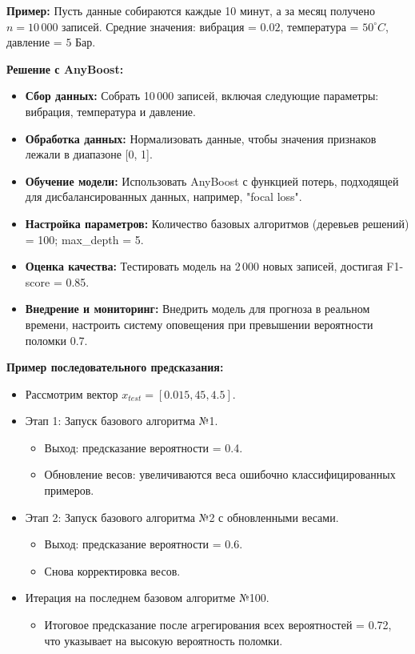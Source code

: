 \textbf{Пример:} 
Пусть данные собираются каждые 10 минут, а за месяц получено $n = 10\,000$ записей. Средние значения: вибрация = $0.02$, температура = $50^\circ C$, давление = $5$ Бар.

\textbf{Решение с AnyBoost:}
\begin{itemize}
    \item \textbf{Сбор данных:} Собрать 10\,000 записей, включая следующие параметры: вибрация, температура и давление.
    \item \textbf{Обработка данных:} Нормализовать данные, чтобы значения признаков лежали в диапазоне [0, 1].
    \item \textbf{Обучение модели:} Использовать AnyBoost с функцией потерь, подходящей для дисбалансированных данных, например, "focal loss".
    \item \textbf{Настройка параметров:} Количество базовых алгоритмов (деревьев решений) = 100; max\_depth = 5.
    \item \textbf{Оценка качества:} Тестировать модель на 2\,000 новых записей, достигая F1-score = 0.85.
    \item \textbf{Внедрение и мониторинг:} Внедрить модель для прогноза в реальном времени, настроить систему оповещения при превышении вероятности поломки 0.7.
\end{itemize}

\textbf{Пример последовательного предсказания:}
\begin{itemize}
    \item Рассмотрим вектор $x_{test} = [0.015, 45, 4.5]$.
    \item Этап 1: Запуск базового алгоритма №1.
        \begin{itemize}
            \item Выход: предсказание вероятности = 0.4.
            \item Обновление весов: увеличиваются веса ошибочно классифицированных примеров.
        \end{itemize}
    \item Этап 2: Запуск базового алгоритма №2 с обновленными весами.
        \begin{itemize}
            \item Выход: предсказание вероятности = 0.6.
            \item Снова корректировка весов.
        \end{itemize}
    \item Итерация на последнем базовом алгоритме №100.
        \begin{itemize}
            \item Итоговое предсказание после агрегирования всех вероятностей = 0.72, что указывает на высокую вероятность поломки.
        \end{itemize}
\end{itemize}


